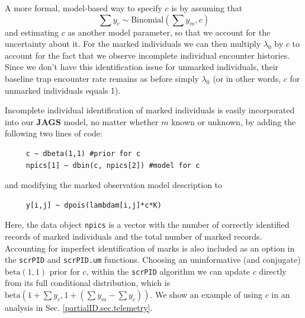 A more formal, model-based way to specify $c$ is by assuming that
\[
\sum y_c \sim \mbox{Binomial}(\sum y_m, c)
\]
and estimating $c$ as another model parameter, so that we account for the uncertainty about it.
For the marked individuals we can then multiply $\lambda_0$
by $c$ to account for the fact that we observe incomplete individual
encounter histories. Since we don't have this identification issue for
unmarked individuals, their baseline trap encounter rate remains as
before simply $\lambda_0$ (or in other words, $c$ for unmarked individuals equals 1).

Incomplete individual identification of marked individuals is easily
incorporated into our {\bf JAGS} model, no matter whether $m$ known or
unknown, by adding the following two lines of code: 
{\small
\begin{verbatim}
     c ~ dbeta(1,1) #prior for c
     npics[1] ~ dbin(c, npics[2]) #model for c
\end{verbatim}
}
and modifying the marked observation model description to
{\small
\begin{verbatim}
     y[i,j] ~ dpois(lambdam[i,j]*c*K)
\end{verbatim}
}
Here, the data object {\tt npics} is a vector with the number of correctly identified records of marked individuals and the total number of marked records. Accounting for imperfect identification of marks is also included as an option in the {\tt scrPID} and  {\tt scrPID.um} functions. Choosing an uninformative (and conjugate) $\mbox{beta}(1,1)$ prior for $c$, within the {\tt scrPID} algorithm we can update $c$ directly from its full conditional distribution, which is $\mbox{beta}(1 + \sum y_c, 1 + (\sum y_m-\sum y_c))$.
We show an example of using $c$ in an analysis in
Sec. \ref{partialID.sec.telemetry}.

